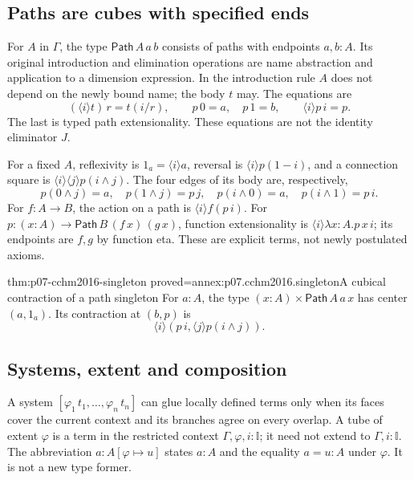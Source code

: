 \subsection{Paths are cubes with specified ends}
\label{sec:p07-cchm2016-paths}

For \(A\) in \(\Gamma\), the type \(\mathsf{Path}\,A\,a\,b\) consists
of paths with endpoints \(a,b:A\).  Its original introduction and
elimination operations are name abstraction and application to a
dimension expression.  In the introduction rule \(A\) does not
depend on the newly bound name; the body \(t\) may.  The equations are
\[
 (\langle i\rangle t)\,r=t(i/r),\qquad
 p\,0=a,\quad p\,1=b,\qquad \langle i\rangle p\,i=p.
\]
The last is typed path extensionality.  These equations are not the
identity eliminator \(J\).

For a fixed \(A\), reflexivity is
\(1_a=\langle i\rangle a\), reversal is
\(\langle i\rangle p(1-i)\), and a connection square is
\(\langle i\rangle\langle j\rangle p(i\wedge j)\).
The four edges of its body are, respectively,
\[
 p(0\wedge j)=a,\quad p(1\wedge j)=p\,j,\quad
 p(i\wedge0)=a,\quad p(i\wedge1)=p\,i.
\]
For \(f:A\to B\), the action on a path is
\(\langle i\rangle f(p\,i)\).  For
\(p:(x:A)\to\mathsf{Path}\,B\,(f\,x)\,(g\,x)\),
function extensionality is
\(\langle i\rangle\lambda x:A.p\,x\,i\); its endpoints are \(f,g\)
by function eta.  These are explicit terms, not newly postulated axioms.

\begin{hblemma}{thm:p07-cchm2016-singleton}
 {proved=annex:p07.cchm2016.singleton}{A cubical contraction of a path singleton}
For \(a:A\), the type
\((x:A)\times\mathsf{Path}\,A\,a\,x\) has center \((a,1_a)\).
Its contraction at \((b,p)\) is
\[
 \langle i\rangle
       (p\,i,\langle j\rangle p(i\wedge j)).
\]
\end{hblemma}

\subsection{Systems, extent and composition}
\label{sec:p07-cchm2016-composition}

A system \([\varphi_1\,t_1,\ldots,\varphi_n\,t_n]\) can glue
locally defined terms only when its faces cover the current context
and its branches agree on every overlap.  A tube of extent \(\varphi\)
is a term in the restricted context \(\Gamma,\varphi,i:\mathbb I\);
it need not extend to \(\Gamma,i:\mathbb I\).  The abbreviation
\(a:A[\varphi\mapsto u]\) states \(a:A\) and the equality \(a=u:A\)
under \(\varphi\).  It is not a new type former.

